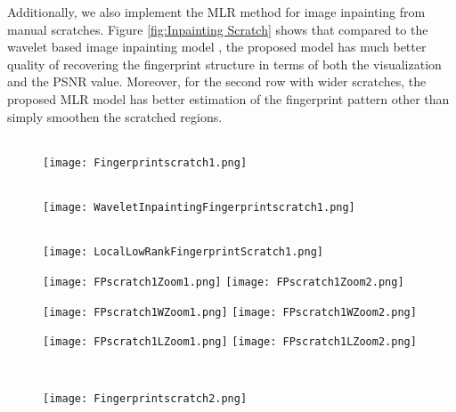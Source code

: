 \documentclass[letterpaper,10pt]{article}
\begin{document}
Additionally, we also implement the MLR method for image inpainting from manual scratches. Figure \ref{fig:Inpainting Scratch} shows that compared to the wavelet based image inpainting model \cite{cai2008framelet}, the proposed model has much better quality of recovering the fingerprint structure in terms of both the visualization and the PSNR value. Moreover, for the second row with wider scratches, the proposed MLR model has better estimation of the fingerprint pattern other than simply smoothen the scratched regions.
\begin{figure}[htp]
\begin{center}
\begin{minipage}{0.32\linewidth}
\\
\texttt{[image: Fingerprintscratch1.png]}
\end{minipage}
\begin{minipage}{0.32\linewidth}
\\
\texttt{[image: WaveletInpaintingFingerprintscratch1.png]}
\end{minipage}
\begin{minipage}{0.32\linewidth}
\\
\texttt{[image: LocalLowRankFingerprintScratch1.png]}
\end{minipage}
\begin{minipage}{0.32\linewidth}
\texttt{[image: FPscratch1Zoom1.png]}
\texttt{[image: FPscratch1Zoom2.png]}\\
\end{minipage}
\begin{minipage}{0.32\linewidth}
\texttt{[image: FPscratch1WZoom1.png]}
\texttt{[image: FPscratch1WZoom2.png]}\\
\end{minipage}
\begin{minipage}{0.32\linewidth}
\texttt{[image: FPscratch1LZoom1.png]}
\texttt{[image: FPscratch1LZoom2.png]}\\
\end{minipage}\\
\begin{minipage}{0.32\linewidth}
\texttt{[image: Fingerprintscratch2.png]}
\end{minipage}

\end{center}
\end{figure}
\end{document}
